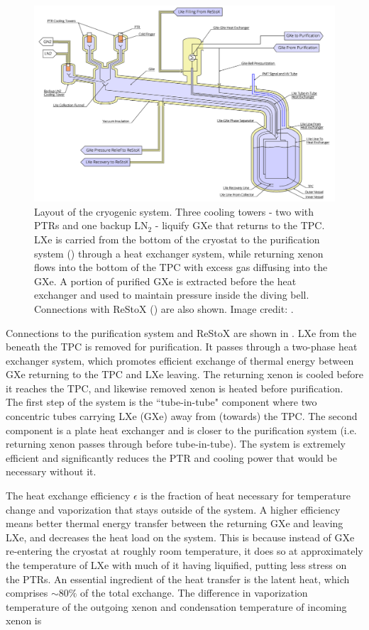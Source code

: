 \begin{figure}
\centering
\includegraphics[width=\textwidth]{CryostatSchematic}
\caption{Layout of the cryogenic system.  Three cooling towers - two with PTRs and one backup $\mathrm{LN_2}$ - liquify GXe that returns
to the TPC.  LXe is carried from the bottom of the cryostat to the purification system () through a heat
exchanger system, while
returning xenon flows into the bottom of the TPC with excess gas diffusing into the GXe.  A portion of purified GXe is extracted
before the heat exchanger and used to maintain pressure inside the diving bell.  Connections with ReStoX ()
are also shown.  Image credit: .}
\label{fig:xenon1t_cryogenics_schematic}
\end{figure}

Connections to the purification system and ReStoX are shown in .  LXe from the beneath the TPC is
removed for purification.  It passes
through a two-phase heat exchanger system, which promotes efficient exchange of thermal energy between GXe returning to the TPC
and LXe leaving.  The returning xenon is cooled before it reaches the TPC, and likewise removed xenon is heated before
purification.  The first step of the system is the ``tube-in-tube" component where two concentric tubes carrying LXe (GXe) away from
(towards)
the TPC.  The second component is a plate heat exchanger and is closer to the purification system (i.e. returning xenon passes through
before tube-in-tube).  The system is extremely efficient and significantly reduces the PTR and  cooling power that would be
necessary without it.

The heat exchange
efficiency $\epsilon$ is the fraction of heat necessary for temperature change and vaporization that stays outside of the system.  A
higher efficiency means better thermal energy transfer between the returning GXe and leaving LXe, and decreases the heat load on the
system.  This is because instead of GXe re-entering the cryostat at roughly
room temperature, it does so at approximately the temperature of LXe with much of it having liquified, putting less stress on the
PTRs.  An essential ingredient of the heat transfer is the latent heat, which comprises ${\sim} 80\%$ of the total exchange.  The
difference in vaporization temperature of the outgoing xenon and condensation temperature of incoming xenon is

